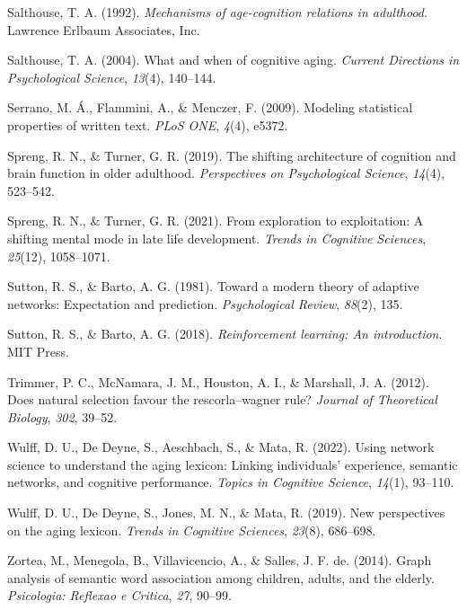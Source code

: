\documentclass[
  man]{apa6}
\newlength{\cslhangindent}
\newlength{\cslentryspacingunit} %
\newenvironment{CSLReferences}[2] %
 {%
  \setlength{\parindent}{0pt}
  \ifodd #1
  \let\oldpar\par
  \def\par{\hangindent=\cslhangindent\oldpar}
  \fi
  \setlength{\parskip}{#2\cslentryspacingunit}
 }%
 {}
\begin{document}
\begin{CSLReferences}{1}{0}
\leavevmode{}%
Salthouse, T. A. (1992). \emph{Mechanisms of age-cognition relations in adulthood}. Lawrence Erlbaum Associates, Inc.

\leavevmode{}%
Salthouse, T. A. (2004). {What and when of cognitive aging}. \emph{Current Directions in Psychological Science}, \emph{13}(4), 140--144.

\leavevmode{}%
Serrano, M. Á., Flammini, A., \& Menczer, F. (2009). Modeling statistical properties of written text. \emph{PLoS ONE}, \emph{4}(4), e5372.

\leavevmode{}%
Spreng, R. N., \& Turner, G. R. (2019). The shifting architecture of cognition and brain function in older adulthood. \emph{Perspectives on Psychological Science}, \emph{14}(4), 523--542.

\leavevmode{}%
Spreng, R. N., \& Turner, G. R. (2021). From exploration to exploitation: A shifting mental mode in late life development. \emph{Trends in Cognitive Sciences}, \emph{25}(12), 1058--1071.

\leavevmode{}%
Sutton, R. S., \& Barto, A. G. (1981). Toward a modern theory of adaptive networks: Expectation and prediction. \emph{Psychological Review}, \emph{88}(2), 135.

\leavevmode{}%
Sutton, R. S., \& Barto, A. G. (2018). \emph{Reinforcement learning: An introduction}. MIT Press.

\leavevmode{}%
Trimmer, P. C., McNamara, J. M., Houston, A. I., \& Marshall, J. A. (2012). Does natural selection favour the rescorla--wagner rule? \emph{Journal of Theoretical Biology}, \emph{302}, 39--52.

\leavevmode{}%
Wulff, D. U., De Deyne, S., Aeschbach, S., \& Mata, R. (2022). Using network science to understand the aging lexicon: Linking individuals' experience, semantic networks, and cognitive performance. \emph{Topics in Cognitive Science}, \emph{14}(1), 93--110.

\leavevmode{}%
Wulff, D. U., De Deyne, S., Jones, M. N., \& Mata, R. (2019). New perspectives on the aging lexicon. \emph{Trends in Cognitive Sciences}, \emph{23}(8), 686--698.

\leavevmode{}%
Zortea, M., Menegola, B., Villavicencio, A., \& Salles, J. F. de. (2014). Graph analysis of semantic word association among children, adults, and the elderly. \emph{Psicologia: Reflexao e Critica}, \emph{27}, 90--99.

\end{CSLReferences}
\end{document}
